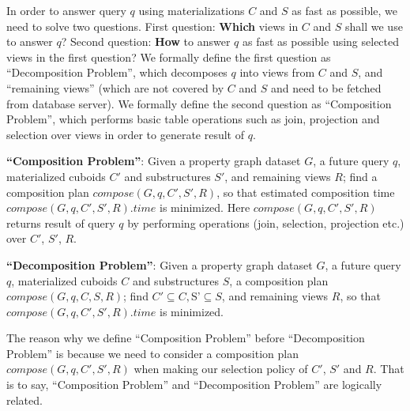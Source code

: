 In order to answer query $q$ using materializations $C$ and $S$ as fast as possible, we need to solve two questions. First question: \textbf{Which} views in $C$ and $S$ shall we use to answer $q$? Second question: \textbf{How} to answer $q$ as fast as possible using selected views in the first question? We formally define the first question as  ``Decomposition Problem'', which decomposes $q$ into views from $C$ and $S$, and ``remaining views'' (which are not covered by $C$ and $S$ and need to be fetched from database server). We formally define the second question as ``Composition Problem'', which performs basic table operations such as join, projection and selection over views in order to generate result of $q$. 

\textbf{``Composition Problem''}:
Given a property graph dataset $G$, a future query $q$, materialized cuboids $C'$ and substructures $S'$, and remaining views $R$; find a composition plan $compose(G, q, C', S', R)$, so that estimated composition time $compose(G, q, C', S', R).time$ is minimized. Here $compose(G, q, C', S', R)$ returns result of query $q$ by performing operations (join, selection, projection etc.) over $C'$, $S'$, $R$.


\textbf{``Decomposition Problem''}:
Given a property graph dataset $G$, a future query $q$, materialized cuboids $C$ and substructures $S$, a composition plan $compose(G, q, C, S, R)$; find $C' \subseteq C, $S'$\subseteq S$, and remaining views $R$, so that $compose(G, q, C', S', R).time$ is minimized. 

The reason why we define ``Composition Problem'' before ``Decomposition Problem'' is because we need to consider a composition plan $compose(G, q, C', S', R)$ when making our selection policy of $C'$, $S'$ and $R$. That is to say, ``Composition Problem'' and ``Decomposition Problem'' are logically related.  

